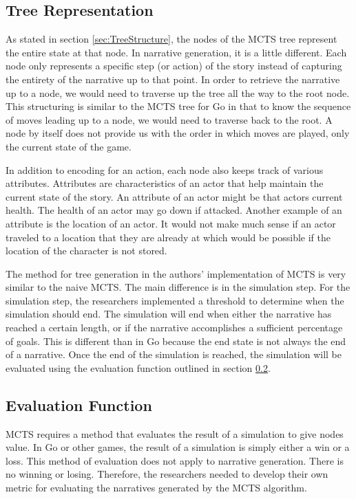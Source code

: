 \documentclass{sig-alternate}
\begin{document}
\subsection{Tree Representation}
As stated in section \ref{sec:TreeStructure}, the nodes of the MCTS tree represent the entire state at that node. In narrative generation, it is a little different. Each node only represents a specific step (or action) of the story instead of capturing the entirety of the narrative up to that point. In order to retrieve the narrative up to a node, we would need to traverse up the tree all the way to the root node. This structuring is similar to the MCTS tree for Go in that to know the sequence of moves leading up to a node, we would need to traverse back to the root. A node by itself does not provide us with the order in which moves are played, only the current state of the game.

In addition to encoding for an action, each node also keeps track of various attributes. Attributes are characteristics of an actor that help maintain the current state of the story. An attribute of an actor might be that actors current health. The health of an actor may go down if attacked. Another example of an attribute is the location of an actor. It would not make much sense if an actor traveled to a location that they are already at which would be possible if the location of the character is not stored.

The method for tree generation in the authors' implementation of MCTS is very similar to the naive MCTS. The main difference is in the simulation step. For the simulation step, the researchers implemented a threshold to determine when the simulation should end. The simulation will end when either the narrative has reached a certain length, or if the narrative accomplishes a sufficient percentage of goals. This is different than in Go because the end state is not always the end of a narrative. Once the end of the simulation is reached, the simulation will be evaluated using the evaluation function outlined in section \ref{sec:EvalFunction}.

\subsection{Evaluation Function}\label{sec:EvalFunction}
MCTS requires a method that evaluates the result of a simulation to give nodes value. In Go or other games, the result of a simulation is simply either a win or a loss. This method of evaluation does not apply to narrative generation. There is no winning or losing. Therefore, the researchers needed to develop their own metric for evaluating the narratives generated by the MCTS algorithm.
\end{document}
